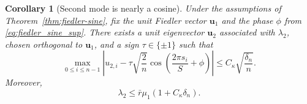 \documentclass[11pt]{article}
\numberwithin{equation}{section}
\newtheorem{corollary}[theorem]{Corollary}
\theoremstyle{definition}
\theoremstyle{remark}
\begin{document}
\begin{corollary}[Second mode is nearly a cosine]\label{cor:second-cosine}
	Under the assumptions of Theorem~\ref{thm:fiedler-sine}, fix the unit
	Fiedler vector $\boldsymbol{u}_1$ and the phase $\phi$ from
	\eqref{eq:fiedler_sine_sup}. There exists a unit eigenvector
	$\boldsymbol{u}_2$ associated with $\lambda_2$, chosen orthogonal to
	$\boldsymbol{u}_1$, and a sign $\tau\in\{\pm1\}$ such that
	\begin{equation}\label{eq:second_cosine_sup}
		\max_{0\le i\le n-1}
		\left|
		u_{2,i}-\tau\sqrt{\frac2n}
		\cos\left(\frac{2\pi s_i}{S}+\phi\right)
		\right|
		\le
		C_\kappa\sqrt{\frac{\delta_n}{n}}.
	\end{equation}
	Moreover,
	\begin{equation}\label{eq:lambda2_upper_for_later}
		\lambda_2\le \bar r\mu_1(1+C_\kappa\delta_n).
	\end{equation}
\end{corollary}
\end{document}
